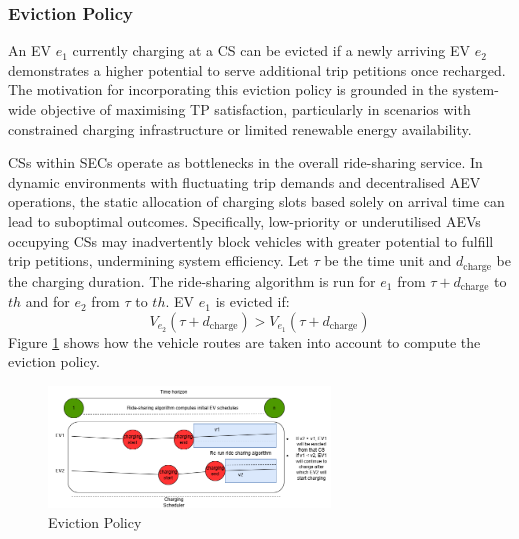 
\subsubsection{Eviction Policy}
An EV \( e_1 \) currently charging at a CS can be evicted if a newly arriving EV \( e_2 \) demonstrates a higher potential to serve additional trip petitions once recharged. The motivation for incorporating this eviction policy is grounded in the system-wide objective of maximising TP satisfaction, particularly in scenarios with constrained charging infrastructure or limited renewable energy availability.

CSs within SECs operate as bottlenecks in the overall ride-sharing service. In dynamic environments with fluctuating trip demands and decentralised AEV operations, the static allocation of charging slots based solely on arrival time can lead to suboptimal outcomes. Specifically, low-priority or underutilised AEVs occupying CSs may inadvertently block vehicles with greater potential to fulfill trip petitions, undermining system efficiency.
Let \( \tau \) be the time unit and \( d_{\text{charge}} \) be the charging duration. The ride-sharing algorithm is run for \( e_1 \) from \( \tau + d_{\text{charge}} \) to \( th \) and for \( e_2 \) from \( \tau \) to \( th \). EV \( e_1 \) is evicted if:
\[
V_{e_2}(\tau + d_{\text{charge}}) > V_{e_1}(\tau + d_{\text{charge}})
\]
Figure \ref{fig:eviction_policy} shows how the vehicle routes are taken into account to compute the eviction policy. 
\begin{figure}[h]
  \vspace{-0.2cm}
  \centering
  \includegraphics[width=7.5cm]{Crest/Images/eviction_policy.png}
  \caption{Eviction Policy}
  \label{fig:eviction_policy}
  \vspace{-0.1cm}
\end{figure}

